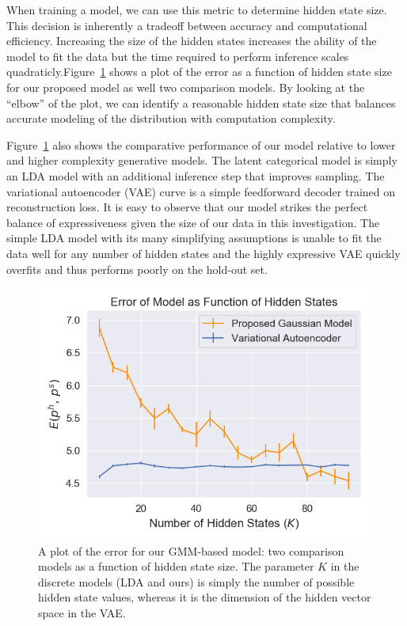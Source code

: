 \documentclass{edm_template}
\newcommand{\piech}[1]{{\color{purple}{[cjp: #1]}}}
\begin{document}
When training a model, we can use this metric to determine hidden state size. This decision is inherently a tradeoff between accuracy and computational efficiency. Increasing the size of the hidden states increases the ability of the model to fit the data  \piech{what about overfitting? This would be an alarming sentence if I were a reviewer. I get what you mean, but I started reading in this section (most reviewers make sure a paper has results before they dive deep in)}  but the time required to perform inference scales quadraticly.Figure~\ref{fig:kl_plot} shows a plot of the error as a function of hidden state size for our proposed model as well two comparison models. By looking at the ``elbow'' of the plot, we can identify a reasonable hidden state size that balances accurate modeling of the distribution with computation complexity.

Figure~\ref{fig:kl_plot} also shows the comparative performance of our model relative to lower and higher complexity generative models. The latent categorical model is simply an LDA model with an additional inference step that improves sampling. The variational autoencoder (VAE) curve is a simple feedforward decoder trained on reconstruction loss. It is easy to observe that our model strikes the perfect balance of expressiveness given the size of our data in this investigation. The simple LDA model with its many simplifying assumptions is unable to fit the data well for any number of hidden states and the highly expressive VAE quickly overfits and thus performs poorly on the hold-out set. 

\begin{figure}[h]
    \centering
    \includegraphics[scale=0.5]{figures/error_vs_hidden_states.png}
    \caption{A plot of the error for our GMM-based model: two comparison models as a function of hidden state size. The parameter $K$ in the discrete models (LDA and ours) is simply the number of possible hidden state values, whereas it is the dimension of the hidden vector space in the VAE.}
    \label{fig:kl_plot}
\end{figure}
\end{document}
